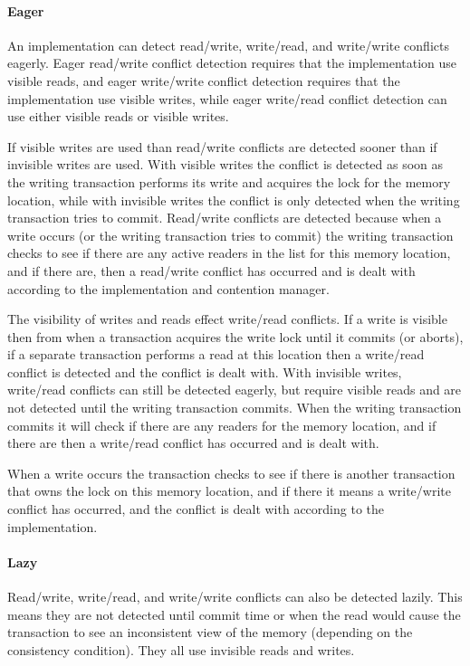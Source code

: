 \paragraph{Eager}
An implementation can detect read/write, write/read, and write/write conflicts eagerly.
Eager read/write conflict detection requires that the implementation use 
visible reads, and eager write/write conflict detection requires that the implementation 
use visible writes, while eager write/read conflict detection can use either visible reads or visible writes.

If visible writes are used than read/write conflicts are detected sooner than if invisible writes are used.
With visible writes the conflict is detected as soon as the writing transaction
 performs its write and acquires the lock for the memory location, while with invisible
 writes the conflict is only detected when the writing transaction tries to commit.
Read/write conflicts are detected because when a write occurs (or the writing
 transaction tries to commit) the writing transaction checks to see if there are
 any active readers in the list for this memory location, and if there are, then
 a read/write conflict has occurred and is dealt with according to the implementation and contention manager.

The visibility of writes and reads effect write/read conflicts.
If a write is visible then from when a transaction acquires the write lock until
 it commits (or aborts), if a separate transaction performs a read at this location
 then a write/read conflict is detected and the conflict is dealt with.
With invisible writes, write/read conflicts can still be detected eagerly,
 but require visible reads and are not detected until the writing transaction commits.
When the writing transaction commits it will check if there are any 
readers for the memory location, and if there are then a write/read conflict has occurred and is dealt with.

When a write occurs the transaction checks to see if there is another 
transaction that owns the lock on this memory location, and if there it
 means a write/write conflict has occurred, and the conflict is dealt with according to the implementation.

\paragraph{Lazy}
Read/write, write/read, and write/write conflicts can also be detected lazily.
This means they are not detected until commit time or when the read would
 cause the transaction to see an inconsistent view of the memory (depending on the consistency condition).
They all use invisible reads and writes.

